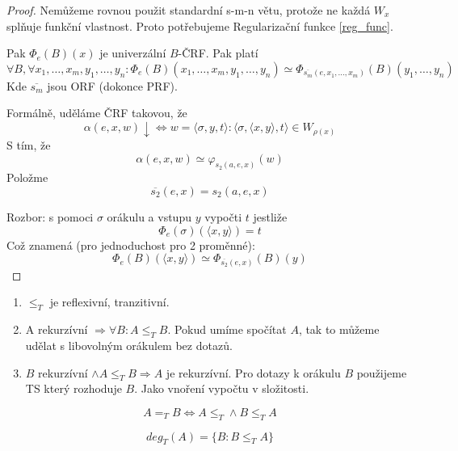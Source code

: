 \begin{theorem}\label{s_m_n_rel}
\end{theorem}
\begin{proof}
	Nemůžeme rovnou použit standardní s-m-n větu, protože ne každá $W_x$ splňuje funkční vlastnost.
	Proto potřebujeme Regularizační funkce \cref{reg_func}.

	Pak $\Phi_e(B)(x)$ je univerzální $B$-ČRF.
	Pak platí
	\[ \forall B, \forall x_1, \ldots, x_m, y_1, \ldots, y_n: \Phi_e(B)(x_1, \ldots, x_m, y_1, \ldots, y_n) \simeq \Phi_{\overline{s_m}(e, x_1, \ldots, x_m)}(B)(y_1, \ldots, y_n) \]
	Kde $\overline{s_m}$ jsou ORF (dokonce PRF).

	Formálně, uděláme ČRF takovou, že
	\[ \alpha(e, x, w) \downarrow \iff w = \langle \sigma, y, t \rangle: \langle \sigma, \langle x, y \rangle, t \rangle \in W_{\rho(x)} \]
	S tím, že
	\[ \alpha(e, x, w) \simeq \varphi_{s_2(a, e, x)}(w) \]
	Položme
	\[ \overline{s_2}(e, x) = s_2(a, e, x) \]

	Rozbor: s pomoci $\sigma$ orákulu a vstupu $y$ vypočti $t$ jestliže
	\[ \Phi_e(\sigma)(\langle x, y \rangle) = t \]
	Což znamená (pro jednoduchost pro 2 proměnné):
	\[ \Phi_e(B)(\langle x, y \rangle) \simeq \Phi_{\overline{s_2}(e, x)}(B)(y) \]
\end{proof}

\begin{properties}
	\begin{enumerate}
		\item $\leq_T$ je reflexivní, tranzitivní.
		\item A rekurzívní $\Rightarrow \forall B: A \leq_T B$.
		Pokud umíme spočítat $A$, tak to můžeme udělat s libovolným orákulem bez dotazů.
		\item $B$ rekurzívní $\land A \leq_T B \Rightarrow A$ je rekurzívní.
			Pro dotazy k orákulu $B$ použijeme TS který rozhoduje $B$.
			Jako vnoření vypočtu v složitosti.
	\end{enumerate}
\end{properties}

\begin{definition}
	\[ A =_T B \iff A \leq_T \land B \leq_T A \]
\end{definition}

\begin{definition}
	\[ deg_T(A) = \{ B: B \leq_T A \} \]
\end{definition}

